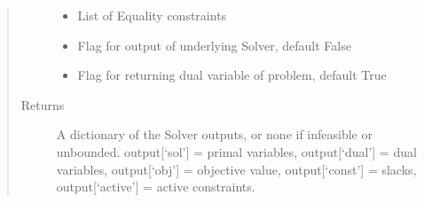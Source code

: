 \documentclass[letterpaper,10pt,english]{sphinxmanual}
\begin{document}
\begin{fulllineitems}
\begin{quote}
\begin{description}
\begin{itemize}
\item {} 
\sphinxAtStartPar
{} \textendash{} List of Equality constraints

\item {} 
\sphinxAtStartPar
{} \textendash{} Flag for output of underlying Solver, default False

\item {} 
\sphinxAtStartPar
{} \textendash{} Flag for returning dual variable of problem, default True

\end{itemize}

\item[{Returns}] \leavevmode
\sphinxAtStartPar
A dictionary of the Solver outputs, or none if infeasible or unbounded. output{[}‘sol’{]} = primal variables, output{[}‘dual’{]} = dual variables, output{[}‘obj’{]} = objective value, output{[}‘const’{]} = slacks, output{[}‘active’{]} = active constraints.

\end{description}\end{quote}

\end{fulllineitems}

\end{document}
